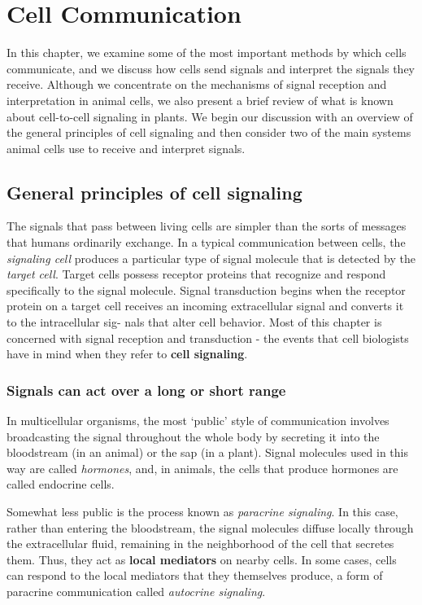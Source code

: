 \chapter{Cell Communication}

In this chapter, we examine some of the most important methods by which
cells communicate, and we discuss how cells send signals and interpret
the signals they receive. Although we concentrate on the mechanisms of
signal reception and interpretation in animal cells, we also present a brief
review of what is known about cell-to-cell signaling in plants. We begin
our discussion with an overview of the general principles of cell signaling
and then consider two of the main systems animal cells use to receive
and interpret signals.

\section{General principles of cell signaling}

The signals that pass between living cells are simpler than the sorts of
messages that humans ordinarily exchange. In a typical communication
between cells, the \textit{signaling cell} produces a particular type of
signal molecule that is detected by the \textit{target cell}.
Target cells possess receptor proteins
that recognize and respond specifically to the signal molecule. Signal
transduction begins when the receptor protein on a target cell receives
an incoming extracellular signal and converts it to the intracellular sig-
nals that alter cell behavior. Most of this chapter is concerned with signal
reception and transduction - the events that cell biologists have in mind
when they refer to \textbf{cell signaling}.

\subsection{Signals can act over a long or short range}

In multicellular organisms, the most `public' style of communication
involves broadcasting the signal throughout the whole body by secreting
it into the bloodstream (in an animal) or the sap (in a plant). Signal molecules
used in this way are called \emph{hormones}, and, in animals, the cells
that produce hormones are called endocrine cells.

Somewhat less public is the process known as \textit{paracrine signaling}. In this
case, rather than entering the bloodstream, the signal molecules diffuse
locally through the extracellular fluid, remaining in the neighborhood of
the cell that secretes them. Thus, they act as \textbf{local mediators} on nearby
cells. In some cases, cells can respond to
the local mediators that they themselves produce, a form of paracrine
communication called \textit{autocrine signaling}.

